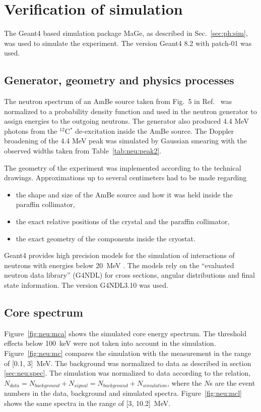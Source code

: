 \section{Verification of simulation}
\label{sec:neu:sim}
The Geant4 \cite{Gea03, Gea06} based simulation package MaGe, as
described in Sec.~\ref{sec:ph:sim}, was used to simulate the
experiment. The version Geant4 8.2 with patch-01 was used.

\subsection{Generator, geometry and physics processes}
\label{sec:simdetail}
The neutron spectrum of an AmBe source taken from Fig.~5 in
Ref.~\cite{Mar95} was normalized to a probability density function and
used in the neutron generator to assign energies to the outgoing
neutrons. The generator also produced 4.4 MeV photons from the
$^{12}$C$^{*}$ de-excitation inside the AmBe source. The Doppler
broadening of the 4.4 MeV peak was simulated by Gaussian smearing with
the observed widths taken from Table~\ref{tab:neu:peak2}.

The geometry of the experiment was implemented according to the
technical drawings. Approximations up to several centimeters had to be
made regarding
\begin{itemize}
\item the shape and size of the AmBe source and how it was held inside
the paraffin collimator,
\item the exact relative positions of the crystal and the paraffin
collimator,
\item the exact geometry of the components inside the cryostat.
\end{itemize}

Geant4 provides high precision models for the simulation of
interactions of neutrons with energies below 20~MeV \cite{Gea03,
Gea06}. The models rely on the ``evaluated neutron data library''
(G4NDL) for cross sections, angular distributions and final state
information. The version G4NDL3.10 was used.

\subsection{Core spectrum}
\label{sec:neu:spemc}
Figure~\ref{fig:neu:mca} shows the simulated core energy spectrum. The
threshold effects below 100~keV were not taken into account in the
simulation. Figure~\ref{fig:neu:mc} compares the simulation with the
measurement in the range of [0.1, 3]~MeV. The background was
normalized to data as described in section \ref{sec:neu:spec}. The
simulation was normalized to data according to the relation, $N_{data}
= N_{background} + N_{signal} = N_{background} + N_{simulation}$,
where the $N$s are the event numbers in the data, background and
simulated spectra. Figure~\ref{fig:neu:mcl} shows the same spectra in
the range of [3, 10.2]~MeV.

